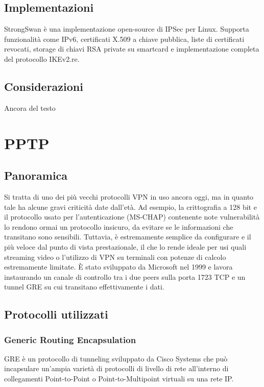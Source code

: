 \subsection{Implementazioni}
StrongSwan è una implementazione open-source di IPSec per Linux. Supporta funzionalità come IPv6, certificati X.509 a chiave pubblica, liste di certificati revocati, storage di chiavi RSA private su smartcard e implementazione completa del protocollo IKEv2.re.

\subsection{Considerazioni}
Ancora del testo

\section{PPTP}
\subsection{Panoramica}
Si tratta di uno dei più vecchi protocolli VPN in uso ancora oggi, ma in quanto tale ha alcune gravi criticità date dall'età. Ad esempio, la crittografia a 128 bit e il protocollo usato per l'autenticazione (MS-CHAP) contenente note vulnerabilità lo rendono ormai un protocollo insicuro, da evitare se le informazioni che transitano sono sensibili.
Tuttavia, è estremamente semplice da configurare e il più veloce dal punto di vista prestazionale, il che lo rende ideale per usi quali streaming video o l'utilizzo di VPN su terminali con potenze di calcolo estremamente limitate.
È stato sviluppato da Microsoft nel 1999 \cite[RFC2637]{RFC2637} e lavora instaurando un canale di controllo tra i due peers sulla porta 1723 TCP e un tunnel GRE su cui transitano effettivamente i dati.

\subsection{Protocolli utilizzati}
\subsubsection{Generic Routing Encapsulation}
GRE è un protocollo di tunneling sviluppato da Cisco Systems che può incapsulare un'ampia varietà di protocolli di livello di rete all'interno di collegamenti Point-to-Point o Point-to-Multipoint virtuali su una rete IP.

